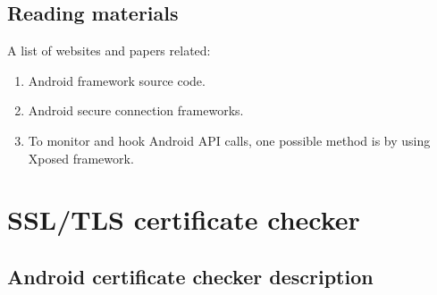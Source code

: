 \documentclass[a4paper, 12pt]{article}
\begin{document}
\subsection{Reading materials}
A list of websites and papers related:
\begin{enumerate} 
\item Android framework source code. \cite{link_aosp}
\item Android secure connection frameworks. \cite{link_android_ssl}
\item To monitor and hook Android API calls, one possible method is by using Xposed \cite{link_xposed} framework.
\end{enumerate}
\section{SSL/TLS certificate checker}
\subsection{Android certificate checker description}
\end{document}

